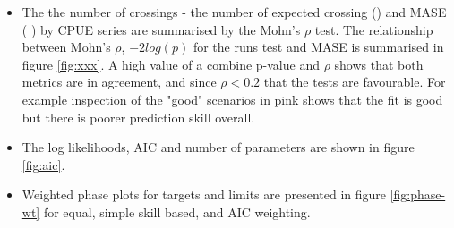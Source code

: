 \begin{itemize}
   \item The the number of crossings - the number of expected crossing (\label{fig:runs}) and MASE ( \label{fig:mase}) by CPUE series are summarised by the Mohn's $\rho$ test. The relationship between Mohn's $\rho$, $-2log(p)$ for the runs test and MASE is summarised in figure \ref{fig:xxx}. A high value of a combine p-value and $\rho$ shows that both metrics are in agreement, and since $\rho<0.2$ that the tests are favourable. For example inspection of the "good" scenarios in pink shows that the fit is good but there is poorer prediction skill overall.
   
   \item The log likelihoods, AIC and number of parameters are shown in figure \ref{fig:aic}.
  
  \item Weighted phase plots for targets and limits are presented in figure \ref{fig:phase-wt} for equal, simple skill based, and AIC weighting. 
 
   
   
  

\end{itemize}


